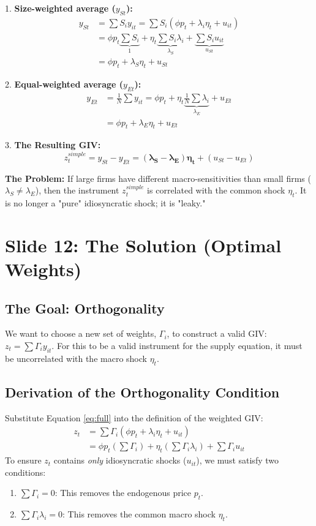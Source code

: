 \documentclass[11pt]{article}
\begin{document}
1. \textbf{Size-weighted average ($y_{St}$):}
\begin{align*}
y_{St} &= \sum S_i y_{it} = \sum S_i (\phi p_t + \lambda_i \eta_t + u_{it}) \\
&= \phi p_t \underbrace{\sum S_i}_{1} + \eta_t \underbrace{\sum S_i \lambda_i}_{\lambda_S} + \underbrace{\sum S_i u_{it}}_{u_{St}} \\
&= \phi p_t + \lambda_S \eta_t + u_{St}
\end{align*}

2. \textbf{Equal-weighted average ($y_{Et}$):}
\begin{align*}
y_{Et} &= \frac{1}{N} \sum y_{it} = \phi p_t + \eta_t \underbrace{\frac{1}{N} \sum \lambda_i}_{\lambda_E} + u_{Et} \\
&= \phi p_t + \lambda_E \eta_t + u_{Et}
\end{align*}

3. \textbf{The Resulting GIV:}
\begin{equation}
z_t^{simple} = y_{St} - y_{Et} = \mathbf{(\lambda_S - \lambda_E) \eta_t} + (u_{St} - u_{Et})
\end{equation}

\textbf{The Problem:} If large firms have different macro-sensitivities than small firms ($\lambda_S \neq \lambda_E$), then the instrument $z_t^{simple}$ is correlated with the common shock $\eta_t$. It is no longer a "pure" idiosyncratic shock; it is "leaky."

\section{Slide 12: The Solution (Optimal Weights)}

\subsection{The Goal: Orthogonality}
We want to choose a new set of weights, $\Gamma_i$, to construct a valid GIV: $z_t = \sum \Gamma_i y_{it}$. For this to be a valid instrument for the supply equation, it must be uncorrelated with the macro shock $\eta_t$.

\subsection{Derivation of the Orthogonality Condition}
Substitute Equation \ref{eq:full} into the definition of the weighted GIV:
\begin{align*}
z_t &= \sum \Gamma_i (\phi p_t + \lambda_i \eta_t + u_{it}) \\
&= \phi p_t (\sum \Gamma_i) + \eta_t (\sum \Gamma_i \lambda_i) + \sum \Gamma_i u_{it}
\end{align*}
To ensure $z_t$ contains \textit{only} idiosyncratic shocks ($u_{it}$), we must satisfy two conditions:
\begin{enumerate}
    \item $\sum \Gamma_i = 0$: This removes the endogenous price $p_t$.
    \item $\sum \Gamma_i \lambda_i = 0$: This removes the common macro shock $\eta_t$.
\end{enumerate}
\end{document}
